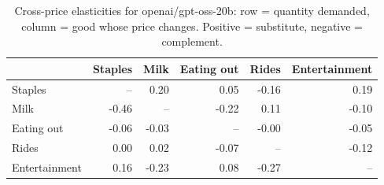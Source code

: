 \begin{table}[!htbp]\centering\small
\caption{Cross-price elasticities for openai/gpt-oss-20b: row = quantity demanded, column = good whose price changes. Positive = substitute, negative = complement.}\label{tab:cross_price_openai_gpt_oss_20b}
\begin{tabular}{lrrrrr}
\hline
 & Staples & Milk & Eating out & Rides & Entertainment \\ \hline
Staples & -- & 0.20 & 0.05 & -0.16 & 0.19 \\
Milk & -0.46 & -- & -0.22 & 0.11 & -0.10 \\
Eating out & -0.06 & -0.03 & -- & -0.00 & -0.05 \\
Rides & 0.00 & 0.02 & -0.07 & -- & -0.12 \\
Entertainment & 0.16 & -0.23 & 0.08 & -0.27 & -- \\
\hline
\end{tabular}
\end{table}